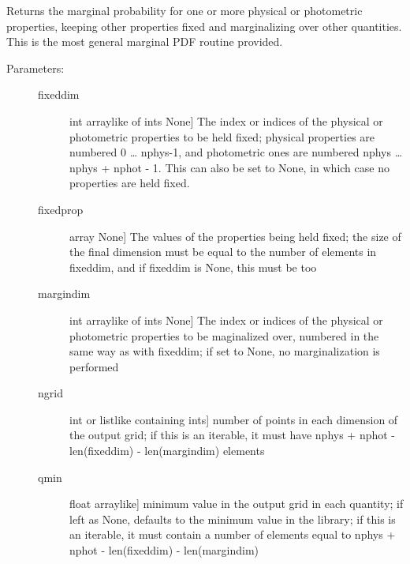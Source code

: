 \documentclass[letterpaper,10pt,english]{sphinxmanual}
\begin{document}
\begin{fulllineitems}
\begin{fulllineitems}
\end{fulllineitems}


\begin{fulllineitems}
\label{\detokenize{cluster_slug:slugpy.cluster_slug.cluster_slug.mpdf_gen}}
Returns the marginal probability for one or more physical or
photometric properties, keeping other properties fixed and
marginalizing over other quantities. This is the most general
marginal PDF routine provided.
\begin{description}
\item[{Parameters:}] \leavevmode\begin{description}
\item[{fixeddim}] \leavevmode{[}int \textbar{} arraylike of ints \textbar{} None{]}
The index or indices of the physical or photometric
properties to be held fixed; physical properties are
numbered 0 … nphys-1, and photometric ones are numbered
nphys … nphys + nphot - 1. This can also be set to
None, in which case no properties are held fixed.

\item[{fixedprop}] \leavevmode{[}array \textbar{} None{]}
The values of the properties being held fixed; the size
of the final dimension must be equal to the number of
elements in fixeddim, and if fixeddim is None, this must
be too

\item[{margindim}] \leavevmode{[}int \textbar{} arraylike of ints \textbar{} None{]}
The index or indices of the physical or photometric
properties to be maginalized over, numbered in the same
way as with fixeddim; if set to None, no marginalization
is performed

\item[{ngrid}] \leavevmode{[}int or listlike containing ints{]}
number of points in each dimension of the output grid;
if this is an iterable, it must have nphys + nphot -
len(fixeddim) - len(margindim) elements

\item[{qmin}] \leavevmode{[}float \textbar{} arraylike{]}
minimum value in the output grid in each quantity; if
left as None, defaults to the minimum value in the
library; if this is an iterable, it must contain a
number of elements equal to nphys + nphot -
len(fixeddim) - len(margindim)


\end{description}
\end{description}
\end{fulllineitems}
\end{fulllineitems}
\end{document}
